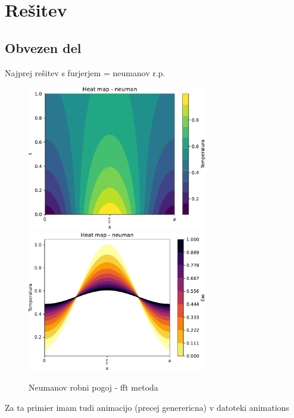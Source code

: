 \section{Rešitev}
\subsection{Obvezen del}
Najprej rešitev s furjerjem = neumanov r.p.
\begin{figure}[h]
    \centering
    \includegraphics[width=0.7\textwidth]{pdfs/heat_map.pdf}
    \includegraphics[width=0.7\textwidth]{pdfs/heat_map2.pdf}
    \caption{Neumanov robni pogoj - fft metoda}
\end{figure}
Za ta primier imam tudi animacijo (precej generericna) v datoteki animations

